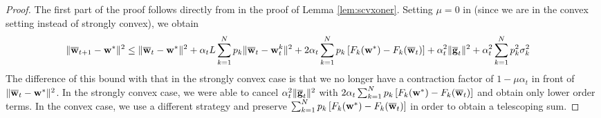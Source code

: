 \begin{proof}
    The first part of the proof follows directly from \eq{\ref{eq:common one step}} in the proof of Lemma \ref{lem:scvxoner}. Setting $\mu=0$ in \eq{\ref{eq:common one step}} (since we are in the convex setting instead of strongly convex), we obtain 
    \begin{align*}
	\|{\overline{\mathbf{w}}}_{t+1}-{\mathbf{w}}^{\ast}\|^{2} & \leq\|{\overline{\mathbf{w}}}_{t}-{\mathbf{w}}^{\ast}\|^{2}+\alpha_{t}L\sum_{k=1}^{N}p_{k}\|{\overline{\mathbf{w}}}_{t}-{\mathbf{w}}_{t}^{k}\|^{2}+2\alpha_{t}\sum_{k=1}^{N}p_{k}\left[F_{k}({\mathbf{w}}^{\ast})-F_{k}({\overline{\mathbf{w}}}_{t})\right]+\alpha_{t}^{2}\|{\overline{\mathbf{g}}}_{t}\|^{2}+\alpha_{t}^{2}\sum_{k=1}^{N}p_{k}^{2}\sigma_{k}^{2}
	\end{align*}
	The difference of this bound with that in the strongly convex case
	is that we no longer have a contraction factor of $1-\mu\alpha_t$ in front of $\|{\overline{\mathbf{w}}}_{t}-{\mathbf{w}}^{\ast}\|^{2}$.
	In the strongly convex case, we were able to cancel $\alpha_{t}^{2}\|{\overline{\mathbf{g}}}_{t}\|^{2}$
	with $2\alpha_{t}\sum_{k=1}^{N}p_{k}\left[F_{k}({\mathbf{w}}^{\ast})-F_{k}({\overline{\mathbf{w}}}_{t})\right]$
	and obtain only lower order terms. In the convex case, we use a different
	strategy and preserve $\sum_{k=1}^{N}p_{k}\left[F_{k}({\mathbf{w}}^{\ast})-F_{k}({\overline{\mathbf{w}}}_{t})\right]$
	in order to obtain a telescoping sum. 
	

\end{proof}
